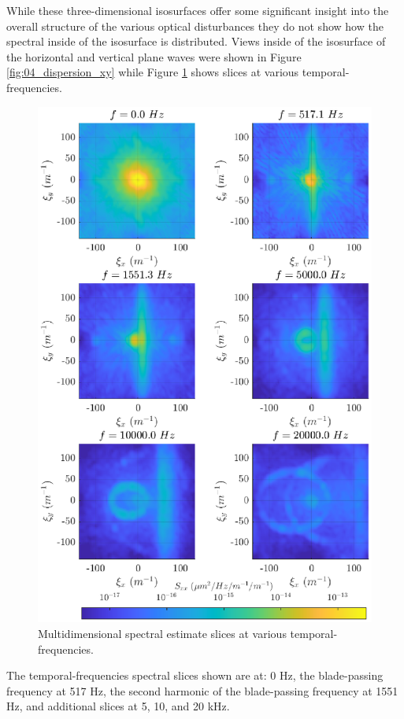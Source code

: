 While these three-dimensional isosurfaces offer some significant insight into the overall structure of the various optical disturbances they do not show how the spectral inside of the isosurface is distributed.
Views inside of the isosurface of the horizontal and vertical plane waves were shown in Figure \ref{fig:04_dispersion_xy} while Figure \ref{fig:04_dispersion_slices} shows slices at various temporal-frequencies.
\begin{figure}
  \centering
  \includegraphics{../matlab/04_dispersion_analysis/dispersion_slices.eps}
  \caption{Multidimensional spectral estimate slices at various temporal-frequencies.}
  \label{fig:04_dispersion_slices}
\end{figure}
The temporal-frequencies spectral slices shown are at: 0 Hz, the blade-passing frequency at 517 Hz, the second harmonic of the blade-passing frequency at 1551 Hz, and additional slices at 5, 10, and 20 kHz.
